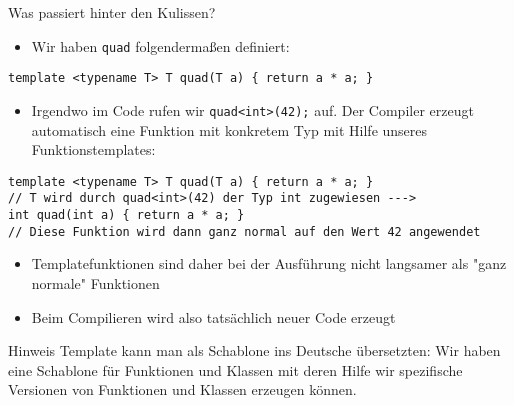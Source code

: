 \documentclass[presentation]{beamer}
\begin{document}
\begin{frame}[label={sec:org6607fd9},fragile]{Was passiert hinter den Kulissen?}
 \begin{itemize}
\item Wir haben {\color{solarizedYellow}\verb!quad!} folgendermaßen definiert:
\end{itemize}
\begin{verbatim}
template <typename T> T quad(T a) { return a * a; }
\end{verbatim}
\begin{itemize}
\item Irgendwo im Code rufen wir {\color{solarizedYellow}\verb!quad<int>(42);!} auf. Der Compiler
\alert{erzeugt automatisch} eine \alert{Funktion mit konkretem Typ} mit Hilfe
unseres Funktionstemplates:
\end{itemize}
\begin{verbatim}
template <typename T> T quad(T a) { return a * a; }
// T wird durch quad<int>(42) der Typ int zugewiesen --->
int quad(int a) { return a * a; }
// Diese Funktion wird dann ganz normal auf den Wert 42 angewendet
\end{verbatim}
\begin{itemize}
\item Templatefunktionen sind daher bei der Ausführung nicht langsamer als
"ganz normale" Funktionen
\item Beim Compilieren wird also tatsächlich \alert{neuer Code erzeugt}
\end{itemize}
\begin{alertblock}{Hinweis}
Template kann man als \alert{Schablone} ins Deutsche übersetzten: Wir haben
eine Schablone für Funktionen und Klassen mit deren Hilfe wir
spezifische Versionen von Funktionen und Klassen erzeugen können.
\end{alertblock}
\end{frame}
\end{document}
